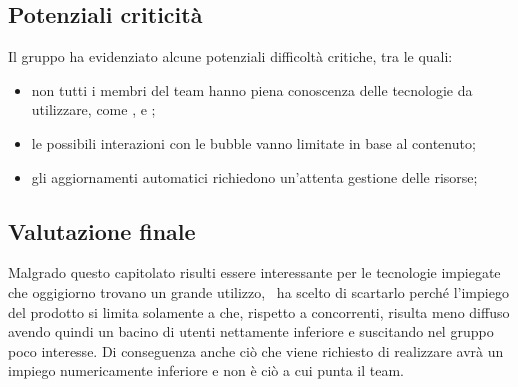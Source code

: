 \documentclass[../StudioDiFattibilita.tex]{subfiles}
\begin{document}
		\subsection{Potenziali criticità}
		Il gruppo ha evidenziato alcune potenziali difficoltà critiche, tra le quali:
        	\begin{itemize}
        		\item non tutti i membri del team hanno piena conoscenza delle tecnologie da utilizzare, come ,  e ;
        		\item le possibili interazioni con le bubble vanno limitate in base al contenuto;
        		\item gli aggiornamenti automatici richiedono un'attenta gestione delle risorse;
        	\end{itemize}

	\subsection{Valutazione finale}
	Malgrado questo capitolato risulti essere interessante per le tecnologie impiegate che oggigiorno trovano un grande utilizzo, \kpanic\ ha scelto di scartarlo perché l'impiego del prodotto si limita solamente a  che, rispetto a concorrenti, risulta meno diffuso avendo quindi un bacino di utenti nettamente inferiore e suscitando nel gruppo poco interesse. Di conseguenza anche ciò che viene richiesto di realizzare avrà un impiego numericamente inferiore e non è ciò a cui punta il team.
\end{document}
